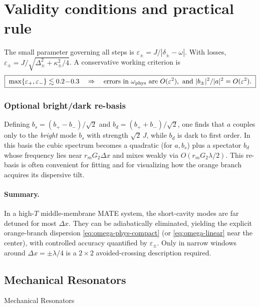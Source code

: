 \section*{Validity conditions and practical rule}
The small parameter governing all steps is
\(
\varepsilon_\pm = J/|\delta_\pm-\omega|
\).
With losses,
\(
\varepsilon_\pm=J/\sqrt{\Delta_\pm^2+\kappa_\pm^2/4}
\).
A conservative working criterion is
\begin{equation}
\boxed{\;
\max\{\varepsilon_+,\varepsilon_-\}\lesssim 0.2\!-\!0.3
\quad\Rightarrow\quad
\text{errors in }\omega_{\rm phys}\text{ are }O(\varepsilon^2),\
\text{and }|b_\pm|^2/|a|^2=O(\varepsilon^2).
\;}
\end{equation}

\subsubsection*{Optional bright/dark re-basis}
Defining \(b_s=(b_+-b_-)/\sqrt2\) and \(b_d=(b_++b_-)/\sqrt2\), one finds that \(a\) couples only to the \emph{bright} mode \(b_s\) with strength \(\sqrt2\,J\), while \(b_d\) is dark to first order. In this basis the cubic spectrum becomes a quadratic (for \(a,b_s\)) plus a spectator \(b_d\) whose frequency lies near \(r_m G_2\Delta x\) and mixes weakly via \(O(r_m G_2\lambda/2)\). This re-basis is often convenient for fitting and for visualizing how the orange branch acquires its dispersive tilt.

\paragraph{Summary.}
In a high-\(T\) middle-membrane MATE system, the short-cavity modes are far detuned for most \(\Delta x\). They can be adiabatically eliminated, yielding the explicit orange-branch dispersion
\eqref{eq:omega-phys-compact} (or \eqref{eq:omega-linear} near the center), with controlled accuracy quantified by \(\varepsilon_\pm\). Only in narrow windows around \(\Delta x=\pm\lambda/4\) is a \(2\times2\) avoided-crossing description required.

\subsection{Mechanical Resonators}{Mechanical Resonators}
